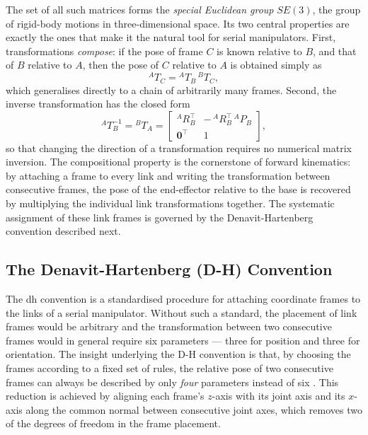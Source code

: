 The set of all such matrices forms the \textit{special Euclidean group} $SE(3)$, the
group of rigid-body motions in three-dimensional space. Its two central properties
are exactly the ones that make it the natural tool for serial manipulators. First,
transformations \textit{compose}: if the pose of frame $C$ is known relative to $B$,
and that of $B$ relative to $A$, then the pose of $C$ relative to $A$ is obtained
simply as
\begin{equation}
    ^A T_C = {}^A T_B \, ^B T_C,
\end{equation}
which generalises directly to a chain of arbitrarily many frames. Second, the inverse
transformation has the closed form
\begin{equation}
    ^A T_B^{-1} = {}^B T_A = \begin{bmatrix}
        ^A R_B^\top & -\,^A R_B^\top \, ^A P_B \\
        \mathbf{0}^\top & 1
    \end{bmatrix},
\end{equation}
so that changing the direction of a transformation requires no numerical matrix
inversion. The compositional property is the cornerstone of forward kinematics: by
attaching a frame to every link and writing the transformation between consecutive
frames, the pose of the end-effector relative to the base is recovered by multiplying
the individual link transformations together. The systematic assignment of these link
frames is governed by the Denavit-Hartenberg convention described next.

\subsection{The Denavit-Hartenberg (D-H) Convention}

The \acrshort{dh} convention is a standardised procedure for attaching coordinate
frames to the links of a serial manipulator. Without such a standard, the placement
of link frames would be arbitrary and the transformation between two consecutive
frames would in general require six parameters --- three for position and three for
orientation. The insight underlying the D-H convention is that, by choosing the frames
according to a fixed set of rules, the relative pose of two consecutive frames can
always be described by only \textit{four} parameters instead of six
\cite{siciliano2009robotics}. This reduction is achieved by aligning each frame's
$z$-axis with its joint axis and its $x$-axis along the common normal between
consecutive joint axes, which removes two of the degrees of freedom in the frame
placement.

